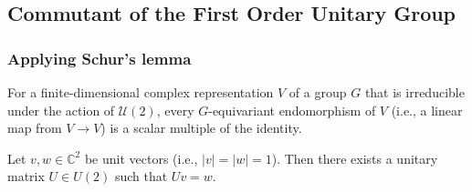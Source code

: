 \subsection{Commutant of the First Order Unitary Group}
\subsubsection{Applying Schur's lemma}
\begin{remark}\label{rm:SchursLemma}
    For a finite-dimensional complex representation $V$ of a group $G$ that is irreducible under the action of $\mathcal{U}(2)$, every $G$-equivariant endomorphism of $V$ (i.e., a linear map from $V \rightarrow V$) is a scalar multiple of the identity.
\end{remark}

\begin{proposition}\label{lemma:Transitivity}
Let $v, w \in \mathbb{C}^2$ be unit vectors (i.e., $|v| = |w| = 1$). Then there exists a unitary matrix $U \in U(2)$ such that $Uv = w$.
\end{proposition}

